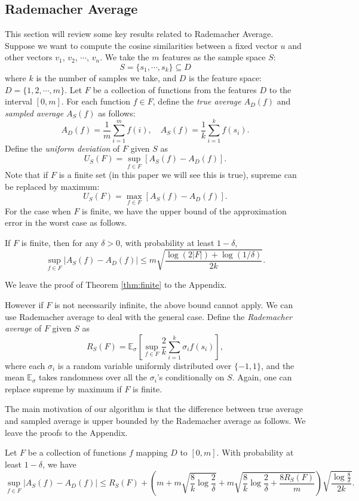 \documentclass{article}
\begin{document}
\subsection{Rademacher Average}
This section will review some key results related to Rademacher Average. 
Suppose we want to compute the cosine similarities between a fixed vector $u$ and other vectors $v_1$, $v_2$, $\cdots$, $v_n$. We take the $m$ features as the sample space $S$:
$$S = \{s_1, \cdots, s_k\} \subseteq D$$
where $k$ is the number of samples we take, and $D$ is the feature space: $D = \{1,2,\cdots,m\}$.
Let $F$ be a collection of functions from the features $D$ to the interval $[0, m]$.
For each function $f\in F$, define the \emph{true average} $A_D(f)$ and \emph{sampled average} $A_S(f)$ as follows:
$$A_D(f) = \frac{1}{m} \sum_{i=1}^m f(i),\quad A_S(f) = \frac{1}{k} \sum_{i=1}^k f(s_i).$$
Define the \emph{uniform deviation} \cite{Oneto13} of $F$ given $S$ as
$$U_S(F) = \sup_{f\in F} [ A_S(f) - A_D(f) ].$$
Note that if $F$ is a finite set (in this paper we will see this is true), supreme can be replaced by maximum:
$$U_S(F) = \max_{f\in F} [ A_S(f) - A_D(f) ].$$
For the case when $F$ is finite, we have the upper bound of the approximation error in the worst case as follows.
\begin{theorem}
\label{thm:finite}
If $F$ is finite, then for any $\delta > 0$, with probability at least $1-\delta$,
$$\sup_{f\in F} | A_S(f) - A_D(f) | \leq m\sqrt{\frac{\log(2|F|) + \log(1/\delta)}{2k}}.$$ 
\end{theorem}
We leave the proof of Theorem \ref{thm:finite} to the Appendix.

However if $F$ is not necessarily infinite, the above bound cannot apply. We can use Rademacher average to deal with the general case. 
Define the \emph{Rademacher average} \cite{Mohri09,BM02,Oneto13} of $F$ given $S$ as
\newcommand{\E}{\mathbb{E}}
$$R_S(F) = \E_\sigma \left[\sup_{f\in F} \frac{2}{k}\sum_{i=1}^k \sigma_i f(s_i) \right],$$
where each $\sigma_i$ is a random variable uniformly distributed over $\{-1, 1\}$, and the mean $\E_\sigma$ takes randomness over all the $\sigma_i$'s conditionally on $S$. Again, one can replace supreme by maximum if $F$ is finite.

The main motivation of our algorithm is that the difference between true average and sampled average is upper bounded by the Rademacher average as follows.
We leave the proofs to the Appendix.

\begin{theorem}
\label{thm:main}
Let $F$ be a collection of functions $f$ mapping $D$ to $[0,m]$. 
With probability at least $1-\delta$, we have
$$\sup_{f\in F}|A_S(f) - A_D(f)| \leq R_S(F) + \left(m+m\sqrt{\frac{8}{k}\log \frac{2}{\delta}} + m\sqrt{\frac{8}{k}\log \frac{2}{\delta} + \frac{8R_S(F)}{m}}\right)\sqrt{\frac{\log \frac{8}{\delta}}{2k}}.$$
\end{theorem}
\end{document}

